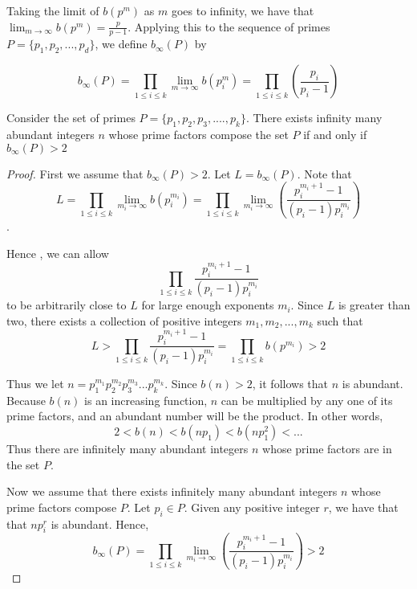 \documentclass[../paper.tex]{article}
\begin{document}
Taking the limit of $b(p^m)$ as $m$ goes to infinity, we have that
$\lim_{m \rightarrow \infty}b(p^m) = \frac{p}{p-1}$.
Applying this to the sequence of primes $P = \{p_1, p_2, ..., p_d\}$,
we define $b_{\infty}(P)$ by

\begin{equation}\label{b_inf_def}
  b_{\infty}(P) 
  = \prod_{1 \leq i \leq k} \lim_{m \rightarrow \infty}b(p_i^m)
                = \prod_{1 \leq i \leq k}(\frac{p_i}{p_i - 1})
\end{equation}


\begin{theorem}\label{b_inf_1}
Consider the set of primes 
%
$P = \{p_{1}, p_{2}, p_{3}, .... , p_{k}\}$.
%
There exists infinity many abundant integers $n$ whose prime 
factors compose the set $P$  if and only if $b_{\infty}(P) > 2$

\end{theorem}

\begin{proof}

First we assume that $b_{\infty}(P) > 2$. Let $L = b_\infty(P)$. 
Note that
%  
$$L 
%
= \prod_{1 \leq i \leq k} \lim_{m_i \rightarrow \infty}b(p_i^{m_i}) 
%
= \prod_{1 \leq i \leq k} \lim_{m_i \rightarrow \infty} 
%
( \frac{p_i^{m_{i} + 1} -1}{(p_i -1)p_{i}^{m_{i}}})$$.

Hence , we can allow
$$\prod_{1 \leq i \leq k} \frac{p_i^{m_{i} + 1} -1}
{(p_i -1)p_{i}^{m_{i}}}$$ 
to be arbitrarily close to $L$ for large 
enough exponents $m_i$. Since $L$ is greater than two, there exists a
collection of positive integers $m_1, m_2, ... , m_k$ such that 
% 
$$L > \prod_{1 \leq i \leq k} \frac{p_i^{m_{i} + 1} -1}
{(p_i -1)p_{i}^{m_{i}}} = \prod_{1 \leq i \leq k} b(p^{m_i}) > 2$$
%

Thus we let $n=p_1^{m_1}p_2^{m_2}p_3^{m_3}...p_{k}^{m_k}$. 
Since $b(n) > 2$, it follows that $n$ is abundant. 
Because $b(n)$ is an increasing function, $n$ can be multiplied
by any one of its prime factors, and an abundant number 
will be the product. In other words,
%
$$2 < b(n) < b(np_1) < b(np_1^2) < ...$$
%
Thus there are infinitely many abundant integers $n$ whose prime
factors are in the set $P$.

Now we assume that there exists infinitely many abundant integers 
$n$ whose prime factors compose $P$. Let $p_i \in P$. Given any
positive integer $r$, we have that that $np_i^r$ is abundant. 
Hence,
%
$$ b_\infty(P) = \prod_{1 \leq i \leq k} \lim_{m_i \rightarrow 
\infty} ( \frac{p_i^{m_{i} + 1} -1}{(p_i -1)p_{i}^{m_{i}}}) > 2$$

\end{proof}
\end{document}
